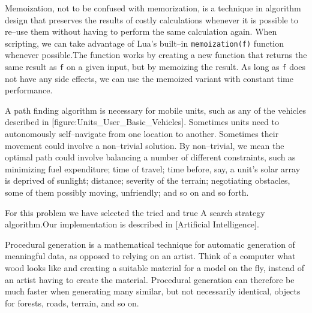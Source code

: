 
Memoization, not to be confused with memorization, is a technique in algorithm design that preserves the results of costly calculations whenever it is possible to re--use them without having to perform the same calculation again. When scripting, we can take advantage of Lua's built--in {\tt memoization(f)} function whenever possible. The function works by creating a new function that returns the same result as {\tt f} on a given input, but by memoizing the result. As long as {\tt f} does not have any side effects, we can use the memoized variant with constant time performance.


A path finding algorithm is necessary for mobile units, such as any of the vehicles described in [figure:Units_User_Basic_Vehicles]. Sometimes units need to autonomously self--navigate from one location to another. Sometimes their movement could involve a non--trivial solution. By non--trivial, we mean the optimal path could involve balancing a number of different constraints, such as minimizing fuel expenditure; time of travel; time before, say, a unit's solar array is deprived of sunlight; distance; severity of the terrain; negotiating obstacles, some of them possibly moving, unfriendly; and so on and so forth.
\crlf

    {}

For this problem we have selected the tried and true A\high{*} search strategy algorithm. Our implementation is described in [Artificial Intelligence].

    {}


Procedural generation is a mathematical technique for automatic generation of meaningful data, as opposed to relying on an artist. Think of a computer  what wood looks like and creating a suitable material for a model on the fly, instead of an artist having to create the material. Procedural generation can therefore be much faster when generating many similar, but not necessarily identical, objects for forests, roads, terrain, and so on.

